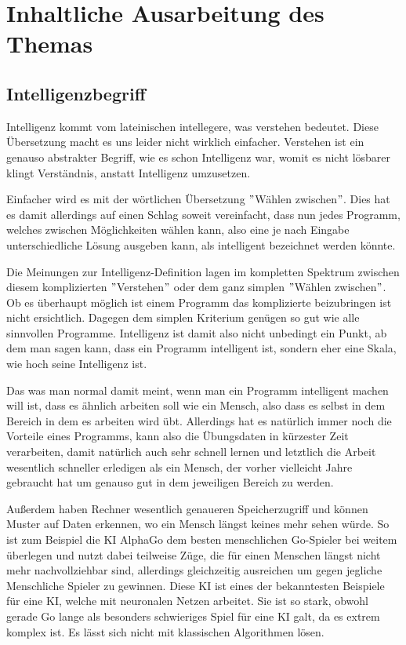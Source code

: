 \section{Inhaltliche Ausarbeitung des Themas}

\subsection{Intelligenzbegriff}
Intelligenz kommt vom lateinischen intellegere, was verstehen bedeutet.
Diese Übersetzung macht es uns leider nicht wirklich einfacher.
Verstehen ist ein genauso abstrakter Begriff, wie es schon Intelligenz war, womit es nicht lösbarer klingt Verständnis, anstatt Intelligenz umzusetzen.


Einfacher wird es mit der wörtlichen Übersetzung $"$Wählen zwischen$"$.
Dies hat es damit allerdings auf einen Schlag soweit vereinfacht, dass nun jedes Programm, welches zwischen Möglichkeiten wählen kann, also eine je nach Eingabe unterschiedliche Lösung ausgeben kann, als intelligent bezeichnet werden könnte.


Die Meinungen zur Intelligenz-Definition lagen im kompletten Spektrum zwischen diesem komplizierten $"$Verstehen$"$ oder dem ganz simplen $"$Wählen zwischen$"$.
Ob es überhaupt möglich ist einem Programm das komplizierte beizubringen ist nicht ersichtlich.
Dagegen dem simplen Kriterium genügen so gut wie alle sinnvollen Programme.
Intelligenz ist damit also nicht unbedingt ein Punkt, ab dem man sagen kann, dass ein Programm intelligent ist, sondern eher eine Skala, wie hoch seine Intelligenz ist.

Das was man normal damit meint, wenn man ein Programm intelligent machen will ist, dass es ähnlich arbeiten soll wie ein Mensch, also dass es selbst in dem Bereich in dem es arbeiten wird übt.
Allerdings hat es natürlich immer noch die Vorteile eines Programms, kann also die Übungsdaten in kürzester Zeit verarbeiten, damit natürlich auch sehr schnell lernen und letztlich die Arbeit wesentlich schneller erledigen als ein Mensch, der vorher vielleicht Jahre gebraucht hat um genauso gut in dem jeweiligen Bereich zu werden.

Außerdem haben Rechner wesentlich genaueren Speicherzugriff und können Muster auf Daten erkennen, wo ein Mensch längst keines mehr sehen würde.
So ist zum Beispiel die KI AlphaGo dem besten menschlichen Go-Spieler bei weitem überlegen und nutzt dabei teilweise Züge, die für einen Menschen längst nicht mehr nachvollziehbar sind, allerdings gleichzeitig ausreichen um gegen jegliche Menschliche Spieler zu gewinnen.
Diese KI ist eines der bekanntesten Beispiele für eine KI, welche mit neuronalen Netzen arbeitet.
Sie ist so stark, obwohl gerade Go lange als besonders schwieriges Spiel für eine KI galt, da es extrem komplex ist.
Es lässt sich nicht mit klassischen Algorithmen lösen.


